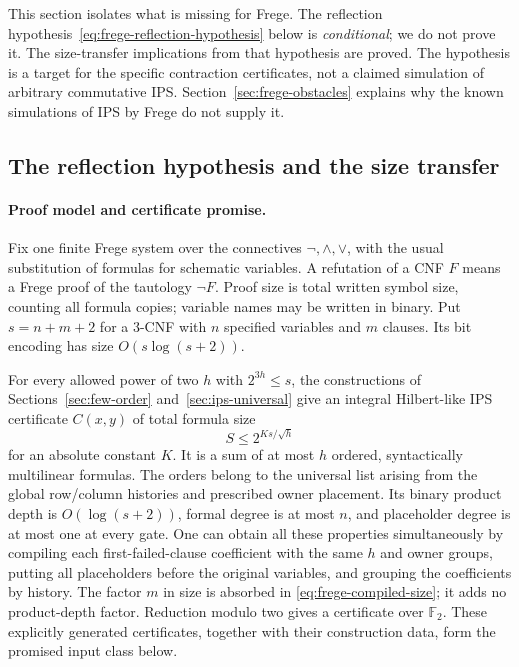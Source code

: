 \documentclass[11pt]{article}
\theoremstyle{definition}
\theoremstyle{remark}
\begin{document}
This section isolates what is missing for Frege. The reflection
hypothesis~\eqref{eq:frege-reflection-hypothesis} below is
\emph{conditional}; we do not prove it. The size-transfer implications
from that hypothesis are proved. The hypothesis is a target for the
specific contraction certificates, not a claimed simulation of
arbitrary commutative IPS. Section~\ref{sec:frege-obstacles} explains
why the known simulations of IPS by Frege do not supply it.

\subsection{The reflection hypothesis and the size transfer}

\paragraph{Proof model and certificate promise.}
Fix one finite Frege system over the connectives $\neg,\wedge,\vee$,
with the usual substitution of formulas for schematic variables.
A refutation of a CNF $F$ means a Frege proof of the tautology
$\neg F$. Proof size is total written symbol size, counting all
formula copies; variable names may be written in binary.
Put $s=n+m+2$ for a 3-CNF with $n$ specified variables and $m$
clauses. Its bit encoding has size $O(s\log(s+2))$.

For every allowed power of two $h$ with $2^{3h}\le s$, the
constructions of Sections~\ref{sec:few-order} and~\ref{sec:ips-universal}
give an integral Hilbert-like IPS
certificate $C(x,y)$ of total formula size
\[
 S\le 2^{K s/\sqrt h}
 \tag{F1}\label{eq:frege-compiled-size}
\]
for an absolute constant $K$. It is a sum of at most $h$ ordered,
syntactically multilinear formulas. The orders belong to the
universal list arising from the global row/column histories and
prescribed owner placement. Its binary product depth is
$O(\log(s+2))$, formal degree is at most $n$, and placeholder
degree is at most one at every gate. One can obtain all these
properties simultaneously by compiling each first-failed-clause
coefficient with the same $h$ and owner groups, putting all
placeholders before the original variables, and grouping the
coefficients by history. The factor $m$ in size is absorbed in
\eqref{eq:frege-compiled-size}; it adds no product-depth factor.
Reduction modulo two gives a certificate over $\mathbb F_2$.
These explicitly generated certificates, together with their
construction data, form the promised input class below.
\end{document}
